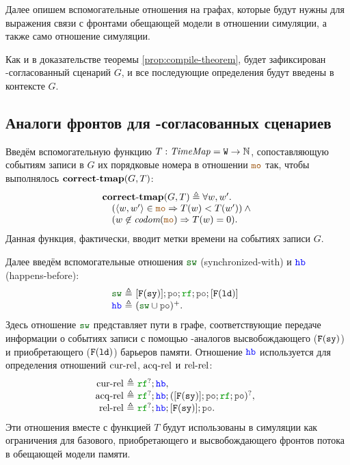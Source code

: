   Далее опишем вспомогательные отношения на графах, которые будут нужны для выражения связи 
с фронтами обещающей модели в отношении симуляции, а также  само отношение симуляции.
  
Как и в доказательстве теоремы \ref{prop:compile-theorem}, будет зафиксирован \ARM-согласованный сценарий $G$, и все последующие определения будут введены в контексте $G$.
  
\subsection{Аналоги фронтов для \ARM-согласованных сценариев}
\label{sec:view}
  Введём вспомогательную функцию $T: \mathit{TimeMap} = {\mathtt{W}} \rightarrow \mathbb{N}$,
  сопоставляющую событиям записи в $G$ их порядковые номера в отношении $\lCO$ так, чтобы  выполнялось ${\rm \bf correct\text{-}tmap}(G, T)$:
  \[\inarr{
    \correctTmap(G, T) \defeq \forall w, w'. \; \\
    \quad (\tup{w, w'} \in \lCO \implies T(w) < T(w')) \land {} \\
    \quad (w \nin \codom{\lCO} \implies T(w) = 0).
  }\]
  Данная функция, фактически, вводит метки времени на событиях записи $G$.
  
  Далее введём вспомогательные отношения $\lSW$ (synchronized-with) и $\lHB$ (happens-before):
  \[\begin{array}{@{}r@{~}r@{~}l}
  \lSW & \defeq & [\lDMBSY]; \lPO; \lRF; \lPO; [\lDMBLD] \\
  \lHB & \defeq & (\lSW \cup \lPO)^{+}. \\
  \end{array}\]
  Здесь отношение $\lSW$ представляет пути в графе, соответствующие передаче информации о событиях
  записи с помощью \ARM-аналогов высвобождающего (${{\mathtt{F}}}(\mathtt{sy})$) и приобретающего (${{\mathtt{F}}}(\mathtt{ld})$) барьеров
  памяти. Отношение $\lHB$ используется для определения отношений ${\rm cur\text{-}rel}$, ${\rm acq\text{-}rel}$ и ${\rm rel\text{-}rel}$:
  \[\begin{array}{@{}r@{~}r@{~}l}
  \curRel & \defeq & \lRF^{?}; \lHB, \\
  \acqRel & \defeq & \lRF^{?}; \lHB; ([\lDMBSY]; \lPO; \lRF; \lPO)^?, \\
  \relRel & \defeq & \lRF^{?}; \lHB; [\lDMBSY]; \lPO. \\
  \end{array}\]
  Эти отношения вместе с функцией $T$ будут использованы в симуляции
  как ограничения для базового, приобретающего и высвобождающего фронтов потока в обещающей модели памяти.

